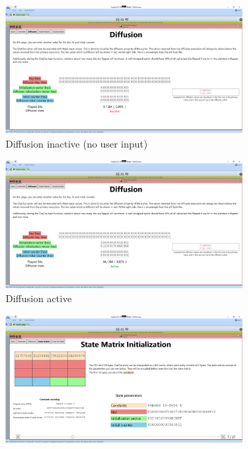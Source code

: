 \begin{figure}
\centering
\begin{subfigure}{0.5\textwidth}
  \centering
  \includegraphics[width=0.99\textwidth]{figures/ct2/diffusion/diffusion-inactive.png}
  \caption{Diffusion inactive (no user input)}
  \label{fig:diffusion.inactive}
\end{subfigure}%
\begin{subfigure}{0.5\textwidth}
  \centering
  \includegraphics[width=0.99\textwidth]{figures/ct2/diffusion/diffusion-active.png}
  \caption{Diffusion active}
  \label{fig:diffusion.active}
\end{subfigure}
\caption{Diffusion page}
\label{fig:diffusion}
\begin{subfigure}{0.5\textwidth}
  \centering
  \includegraphics[width=0.99\textwidth]{figures/ct2/state-matrix/1-state-matrix-constants.png}

\end{subfigure}
\end{figure}
